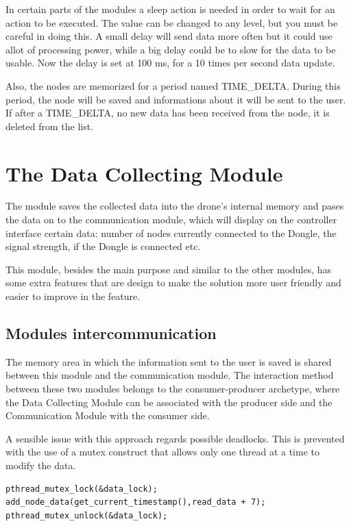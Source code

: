 In certain parts of the modules a sleep action is needed in order to wait for an action to be executed. The value can be changed to any level, but you must be careful in doing this. A small delay will send data more often but it could use allot of processing power, while a big delay could be to slow for the data to be usable. Now the delay is set at 100 ms, for a 10 times per second data update.

Also, the nodes are memorized for a period named TIME\_DELTA. During this period, the node will be saved and informations about it will be sent to the user. If after a TIME\_DELTA, no new data has been received from the node, it is deleted from the list.

\section{The Data Collecting Module}

The module saves the collected data into the drone's internal memory and pases the data on to the communication module, which will display on the controller interface certain data: number of nodes currently connected to the Dongle, the signal strength, if the Dongle is connected etc.

This module, besides the main purpose and similar to the other modules, has some extra features that are design to make the solution more user friendly and easier to improve in the feature.

\subsection{Modules intercommunication}

The memory area in which the information sent to the user is saved is shared between this module and the communication module. The interaction method between these two modules belongs to the consumer-producer archetype, where the Data Collecting Module can be associated with the producer side and the Communication Module with the consumer side.

A sensible issue with this approach regards possible deadlocks. This is prevented with the use of a mutex construct that allows only one thread at a time to modify the data.

\lstset{numbers=none, mathescape=true, nolol=false,caption=Data Collection use of mutex,label=lst:task}
\begin{lstlisting}
pthread_mutex_lock(&data_lock);
add_node_data(get_current_timestamp(),read_data + 7);
pthread_mutex_unlock(&data_lock);
\end{lstlisting}

